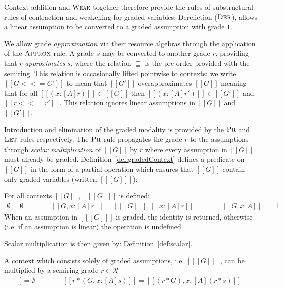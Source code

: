 Context addition and \textsc{Weak} together therefore provide the rules of
substructural rules of contraction and weakening for graded variables.
Dereliction ($\textsc{Der}$), allows a linear assumption to be converted to a
graded assumption with grade $1$. 

We allow grade \textit{approximation} via their resource algebras through the
application of the $\textsc{Approx}$ rule. A grade $s$ may be converted to
another grade $r$, providing that $r$ \textit{approximates} $s$, where the
relation $\sqsubseteq$ is the pre-order provided with the semiring. This
relation is occasionally lifted pointwise to contexts: we write $[[ G <<= G' ]]$
to mean that $[[ G' ]]$ overapproximates $[[ G ]]$ meaning that for all $[[ (x :
[A] r) ]] \in [[ G ]]$ then $[[ (x : [A] r') ]] \in [[ G' ]]$ and $[[ r <<= r'
]]$. This relation ignores linear assumptions in $[[G]]$ and $[[G']]$.

Introduction and elimination of the graded modality is provided by the
$\textsc{Pr}$ and $\textsc{Let}$ rules respectively. The $\textsc{Pr}$ rule
propagates the grade $r$ to the assumptions through \emph{scalar multiplication}
of $[[G]]$ by $r$ where every assumption in $[[ G ]]$ must already be graded.
Definition~\ref{def:gradedContext} defines a predicate on $[[ G ]]$ in the form
of a partial operation which ensures that $[[ G ]]$ contain only graded
variables (written $[[ [ G ] ]]$):
\begin{definition}
  \label{def:gradedContext}
For all contexts $[[ G ]]$, $ [[ [G] ]]$ is defined:
\begin{align*}
    \emptyset = \emptyset
    \qquad\qquad
    [[ G, x : [A] r  ]] = [[ [ G ] ]], [[ x : [ A ] r ]]
    \qquad\qquad
   [[ G, x : A ]] =\ \perp
\end{align*}
When an assumption in $[[ [G] ]]$ is graded, the identity is returned, otherwise 
(i.e. if an assumption is linear) the operation is undefined.
\end{definition}
Scalar multiplication is then given by:
Definition~\ref{def:scalar}.
%
%
\begin{definition}
  \label{def:scalar}
 A context which consists solely of graded assumptions, i.e. $[[ [G] ]]$, can be
 multiplied by a semiring grade $r \in \mathcal{R}$
\begin{align*}
   [[ r * . ]] = \emptyset
    \qquad\qquad
    [[ r * (G , x : [ A ] s) ]] = [[ (r * G), x : [ A ] (r * s) ]]
\end{align*}
\end{definition}

